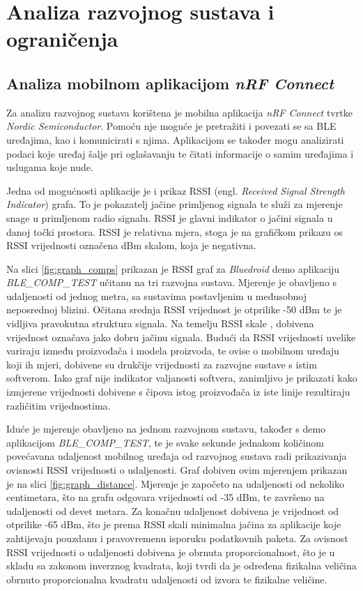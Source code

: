 \chapter{Analiza razvojnog sustava i ograničenja}

\section{Analiza mobilnom aplikacijom \textit{nRF Connect}}

Za analizu razvojnog sustava korištena je mobilna aplikacija \textit{nRF Connect} tvrtke \textit{Nordic Semiconductor}. Pomoću nje moguće je pretražiti i povezati se sa BLE uređajima, kao i komunicirati s njima. Aplikacijom se također mogu analizirati podaci koje uređaj šalje pri oglašavanju te čitati informacije o samim uređajima i uslugama koje nude. \cite{nrfapp}

Jedna od mogućnosti aplikacije je i prikaz RSSI (engl. \textit{Received Signal Strength Indicator}) grafa. To je pokazatelj jačine primljenog signala te služi za mjerenje snage u primljenom radio signalu. RSSI je glavni indikator o jačini signala u danoj točki prostora. RSSI je relativna mjera, stoga je na grafičkom prikazu os RSSI vrijednosti označena dBm skalom, koja je negativna. 

Na slici \ref{fig:graph_comps} prikazan je RSSI graf za \textit{Bluedroid} demo aplikaciju \textit{BLE\_COMP\_TEST} učitanu na tri razvojna sustava. Mjerenje je obavljeno s udaljenosti od jednog metra, sa sustavima postavljenim u međusobnoj neposrednoj blizini. Očitana srednja RSSI vrijednost je otprilike -50 dBm te je vidljiva pravokutna struktura signala. Na temelju RSSI skale \cite{rssi}, dobivena vrijednost označava jako dobru jačinu signala. Budući da RSSI vrijednosti uvelike variraju između proizvođača i modela proizvoda, te ovise o mobilnom uređaju koji ih mjeri, dobivene su drukčije vrijednosti za razvojne sustave s istim softverom. Iako graf nije indikator valjanosti softvera, zanimljivo je prikazati kako izmjerene vrijednosti dobivene s čipova istog proizvođača iz iste linije rezultiraju različitim vrijednostima.

Iduće je mjerenje obavljeno na jednom razvojnom sustavu, također s demo aplikacijom \textit{BLE\_COMP\_TEST}, te je svake sekunde jednakom količinom povećavana udaljenost mobilnog uređaja od razvojnog sustava radi prikazivanja ovisnosti RSSI vrijednosti o udaljenosti. Graf dobiven ovim mjerenjem prikazan je na slici \ref{fig:graph_distance}. Mjerenje je započeto na udaljenosti od nekoliko centimetara, što na grafu odgovara vrijednosti od -35 dBm, te završeno na udaljenosti od devet metara. Za konačnu udaljenost dobivena je vrijednost od otprilike -65 dBm, što je prema RSSI skali \cite{rssi} minimalna jačina za aplikacije koje zahtijevaju pouzdanu i pravovremenu isporuku podatkovnih paketa. Za ovisnost RSSI vrijednosti o udaljenosti dobivena je obrnuta proporcionalnost, što je u skladu sa zakonom inverznog kvadrata, koji tvrdi da je određena fizikalna veličina obrnuto proporcionalna kvadratu udaljenosti od izvora te fizikalne veličine.


